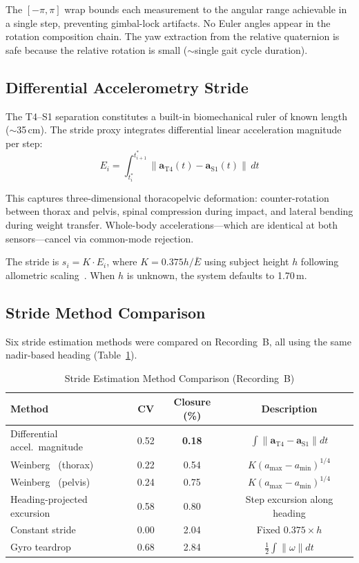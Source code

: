 \documentclass[11pt,a4paper]{article}
\begin{document}
The $[-\pi, \pi]$ wrap bounds each measurement to the angular range achievable
in a single step, preventing gimbal-lock artifacts. No Euler angles appear in
the rotation composition chain. The yaw extraction from the relative quaternion
is safe because the relative rotation is small (${\sim}$single gait cycle
duration).

\subsection{Differential Accelerometry Stride}

The T4--S1 separation constitutes a built-in biomechanical ruler of known
length (${\sim}$35\,cm). The stride proxy integrates differential linear
acceleration magnitude per step:
\begin{equation}
E_i = \int_{t^*_i}^{t^*_{i+1}} \|\mathbf{a}_\text{T4}(t) - \mathbf{a}_\text{S1}(t)\| \, dt
\end{equation}

This captures three-dimensional thoracopelvic deformation: counter-rotation
between thorax and pelvis, spinal compression during impact, and lateral
bending during weight transfer. Whole-body accelerations---which are identical
at both sensors---cancel via common-mode rejection.

The stride is $s_i = K \cdot E_i$, where $K = 0.375h / \bar{E}$ using
subject height $h$ following allometric scaling~\cite{oberg1993}. When $h$ is
unknown, the system defaults to 1.70\,m.

\subsection{Stride Method Comparison}

Six stride estimation methods were compared on Recording~B, all using the same
nadir-based heading (Table~\ref{tab:stride}).

\begin{table}[H]
\centering
\caption{Stride Estimation Method Comparison (Recording~B)}
\label{tab:stride}
\begin{tabular}{@{}lccc@{}}
\toprule
Method & CV & Closure (\%) & Description \\
\midrule
Differential accel.\ magnitude  & 0.52 & \textbf{0.18} & $\int\|\mathbf{a}_\text{T4} - \mathbf{a}_\text{S1}\|dt$ \\
Weinberg~\cite{weinberg2002} (thorax) & 0.22 & 0.54 & $K(a_\text{max} - a_\text{min})^{1/4}$ \\
Weinberg~\cite{weinberg2002} (pelvis) & 0.24 & 0.75 & $K(a_\text{max} - a_\text{min})^{1/4}$ \\
Heading-projected excursion     & 0.58 & 0.80 & Step excursion along heading \\
Constant stride                 & 0.00 & 2.04 & Fixed $0.375 \times h$ \\
Gyro teardrop                   & 0.68 & 2.84 & $\frac{1}{2}\int\|\omega\|dt$ \\
\bottomrule
\end{tabular}
\end{table}
\end{document}
